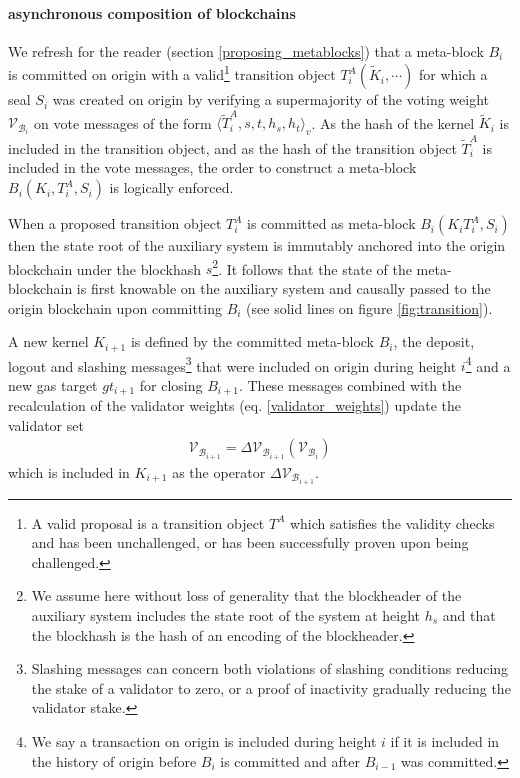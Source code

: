 \documentclass[12pt,a4paper]{article}
\begin{document}
\paragraph{asynchronous composition of blockchains} We refresh for the reader (section \ref{proposing_metablocks}) that a meta-block $B_i$ is committed on origin with a valid\footnote{
  A valid proposal is a transition object $T^A$ which satisfies the validity checks and has been unchallenged, or has been successfully proven upon being challenged.
} transition object $T^A_i(\tilde{K}_i, \cdots)$ for which a seal $S_i$ was created on origin by verifying a supermajority of the voting weight $\mathcal{V}_{\mathcal{B}_i}$ on vote messages of the form $\langle \tilde{T}^A_i, s, t, h_s, h_t \rangle_v$. As the hash of the kernel $\tilde{K}_i$ is included in the transition object, and as the hash of the transition object $\tilde{T}^A_i$ is included in the vote messages, the order to construct a meta-block $B_i(K_i, T^A_i, S_i)$ is logically enforced.

When a proposed transition object $T^A_i$ is committed as meta-block $B_i(K_i T^A_i, S_i)$ then the state root of the auxiliary system is immutably anchored into the origin blockchain under the blockhash $s$\footnote{
  We assume here without loss of generality that the blockheader of the auxiliary system includes the state root of the system at height $h_s$ and that the blockhash is the hash of an encoding of the blockheader.}.
It follows that the state of the meta-blockchain is first knowable on the auxiliary system and causally passed to the origin blockchain upon committing $B_i$ (see solid lines on figure \ref{fig:transition}).

A new kernel $K_{i+1}$ is defined by the committed meta-block $B_i$, the deposit, logout and slashing messages\footnote{
  Slashing messages can concern both violations of slashing conditions reducing the stake of a validator to zero, or a proof of inactivity gradually reducing the validator stake.}
that were included on origin during height $i$\footnote{
  We say a transaction on origin is included during height $i$ if it is included in the history of origin before $B_{i}$ is committed and after $B_{i-1}$ was committed.}
and a new gas target $gt_{i+1}$ for closing $B_{i+1}$.
These messages combined with the recalculation of the validator weights (eq. \ref{validator_weights}) update the validator set
\begin{align}
  \mathcal{V}_{\mathcal{B}_{i+1}} = \Delta\mathcal{V}_{\mathcal{B}_{i+1}}(\mathcal{V}_{\mathcal{B}_{i}})
\end{align}
which is included in $K_{i+1}$ as the operator $\Delta\mathcal{V}_{\mathcal{B}_{i+1}}$. 
\end{document}
